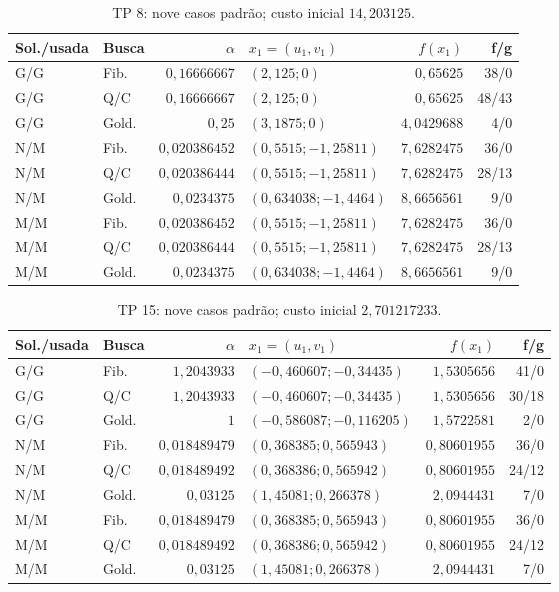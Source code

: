\documentclass[12pt,a4paper]{article}
\begin{document}
\begin{table}[htbp]
\centering
\small
\caption{TP 8: nove casos padrão; custo inicial $14{,}203125$.}
\begin{tabular}{llrlrr}
\toprule
Sol./usada & Busca & $\alpha$ & $x_1=(u_1,v_1)$ & $f(x_1)$ & f/g \\
\midrule
G/G & Fib. & $0{,}16666667$ & $(2{,}125; 0)$ & $0{,}65625$ & 38/0 \\
G/G & Q/C & $0{,}16666667$ & $(2{,}125; 0)$ & $0{,}65625$ & 48/43 \\
G/G & Gold. & $0{,}25$ & $(3{,}1875; 0)$ & $4{,}0429688$ & 4/0 \\
N/M & Fib. & $0{,}020386452$ & $(0{,}5515; -1{,}25811)$ & $7{,}6282475$ & 36/0 \\
N/M & Q/C & $0{,}020386444$ & $(0{,}5515; -1{,}25811)$ & $7{,}6282475$ & 28/13 \\
N/M & Gold. & $0{,}0234375$ & $(0{,}634038; -1{,}4464)$ & $8{,}6656561$ & 9/0 \\
M/M & Fib. & $0{,}020386452$ & $(0{,}5515; -1{,}25811)$ & $7{,}6282475$ & 36/0 \\
M/M & Q/C & $0{,}020386444$ & $(0{,}5515; -1{,}25811)$ & $7{,}6282475$ & 28/13 \\
M/M & Gold. & $0{,}0234375$ & $(0{,}634038; -1{,}4464)$ & $8{,}6656561$ & 9/0 \\
\bottomrule
\end{tabular}
\end{table}

\begin{table}[htbp]
\centering
\small
\caption{TP 15: nove casos padrão; custo inicial $2{,}701217233$.}
\begin{tabular}{llrlrr}
\toprule
Sol./usada & Busca & $\alpha$ & $x_1=(u_1,v_1)$ & $f(x_1)$ & f/g \\
\midrule
G/G & Fib. & $1{,}2043933$ & $(-0{,}460607; -0{,}34435)$ & $1{,}5305656$ & 41/0 \\
G/G & Q/C & $1{,}2043933$ & $(-0{,}460607; -0{,}34435)$ & $1{,}5305656$ & 30/18 \\
G/G & Gold. & $1$ & $(-0{,}586087; -0{,}116205)$ & $1{,}5722581$ & 2/0 \\
N/M & Fib. & $0{,}018489479$ & $(0{,}368385; 0{,}565943)$ & $0{,}80601955$ & 36/0 \\
N/M & Q/C & $0{,}018489492$ & $(0{,}368386; 0{,}565942)$ & $0{,}80601955$ & 24/12 \\
N/M & Gold. & $0{,}03125$ & $(1{,}45081; 0{,}266378)$ & $2{,}0944431$ & 7/0 \\
M/M & Fib. & $0{,}018489479$ & $(0{,}368385; 0{,}565943)$ & $0{,}80601955$ & 36/0 \\
M/M & Q/C & $0{,}018489492$ & $(0{,}368386; 0{,}565942)$ & $0{,}80601955$ & 24/12 \\
M/M & Gold. & $0{,}03125$ & $(1{,}45081; 0{,}266378)$ & $2{,}0944431$ & 7/0 \\
\bottomrule
\end{tabular}
\end{table}
\end{document}
